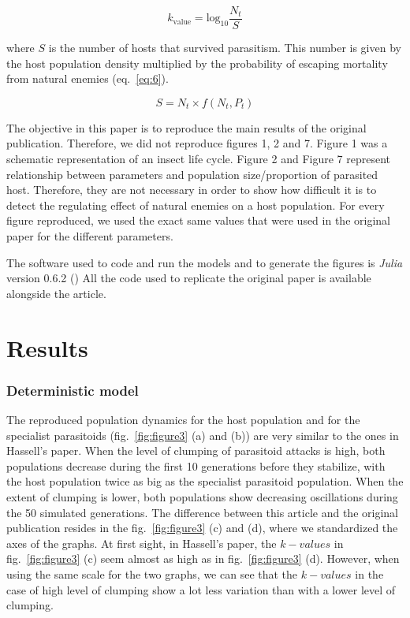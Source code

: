 \documentclass[10pt,a4paper,onecolumn]{article}
\begin{document}
\begin{equation}k_\text{value} = \text{log}_{10}\frac{N_t}{S}\label{eq:5}\end{equation}

where \(S\) is the number of hosts that survived parasitism. This number
is given by the host population density multiplied by the probability of
escaping mortality from natural enemies (eq.~\ref{eq:6}).

\begin{equation}S = N_t \times f(N_t,P_t)\label{eq:6}\end{equation}

The objective in this paper is to reproduce the main results of the
original publication. Therefore, we did not reproduce figures 1, 2 and
7. Figure 1 was a schematic representation of an insect life cycle.
Figure 2 and Figure 7 represent relationship between parameters and
population size/proportion of parasited host. Therefore, they are not
necessary in order to show how difficult it is to detect the regulating
effect of natural enemies on a host population. For every figure
reproduced, we used the exact same values that were used in the original
paper for the different parameters.

The software used to code and run the models and to generate the figures
is \emph{Julia} version 0.6.2 (\textcite{Bezanson17}) All the code used
to replicate the original paper is available alongside the article.

\hypertarget{results}{%
\section{Results}\label{results}}

\hypertarget{deterministic-model}{%
\subsubsection{Deterministic model}\label{deterministic-model}}

The reproduced population dynamics for the host population and for the
specialist parasitoids (fig.~\ref{fig:figure3} (a) and (b)) are very
similar to the ones in Hassell's paper. When the level of clumping of
parasitoid attacks is high, both populations decrease during the first
10 generations before they stabilize, with the host population twice as
big as the specialist parasitoid population. When the extent of clumping
is lower, both populations show decreasing oscillations during the 50
simulated generations. The difference between this article and the
original publication resides in the fig.~\ref{fig:figure3} (c) and (d),
where we standardized the axes of the graphs. At first sight, in
Hassell's paper, the \(k-values\) in fig.~\ref{fig:figure3} (c) seem
almost as high as in fig.~\ref{fig:figure3} (d). However, when using the
same scale for the two graphs, we can see that the \(k-values\) in the
case of high level of clumping show a lot less variation than with a
lower level of clumping.
\end{document}

